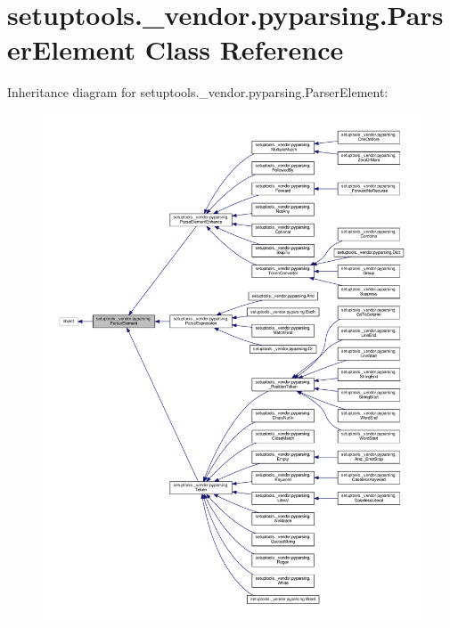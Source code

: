 \hypertarget{classsetuptools_1_1__vendor_1_1pyparsing_1_1ParserElement}{}\section{setuptools.\+\_\+vendor.\+pyparsing.\+Parser\+Element Class Reference}
\label{classsetuptools_1_1__vendor_1_1pyparsing_1_1ParserElement}


Inheritance diagram for setuptools.\+\_\+vendor.\+pyparsing.\+Parser\+Element\+:
\nopagebreak
\begin{figure}[H]
\begin{center}
\leavevmode
\includegraphics[width=350pt]{classsetuptools_1_1__vendor_1_1pyparsing_1_1ParserElement__inherit__graph}
\end{center}
\end{figure}


